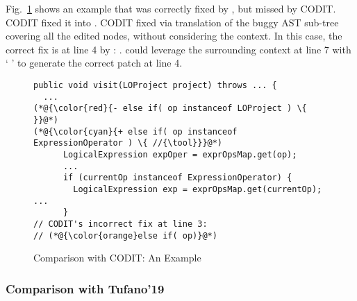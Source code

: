Fig.~\ref{example_codit} shows an example that was correctly fixed
by {\tool}, but missed by CODIT. CODIT fixed it into 
 . CODIT fixed via translation of the buggy AST
sub-tree covering all the edited nodes, without considering the
context.
In this case, the correct fix is at line 4 by {\tool}: 
  
. {\tool} could leverage the surrounding
context at line 7 with ` 
' to generate the correct patch at line 4.



\begin{figure}[t]
	\centering
	\begin{lstlisting}[]
public void visit(LOProject project) throws ... {
  ...
(*@{\color{red}{- else if( op instanceof LOProject ) \{ }}@*)
(*@{\color{cyan}{+ else if( op instanceof ExpressionOperator ) \{ //{\tool}}}@*)
      LogicalExpression expOper = exprOpsMap.get(op);
      ...
      if (currentOp instanceof ExpressionOperator) {
        LogicalExpression exp = exprOpsMap.get(currentOp); ...
      }
// CODIT's incorrect fix at line 3:
// (*@{\color{orange}else if( op)}@*) 
	\end{lstlisting}
        \vspace{-17pt}
	\caption{Comparison with CODIT: An Example}
	\label{example_codit}
\end{figure}

\subsubsection{\bf Comparison with Tufano'19}





